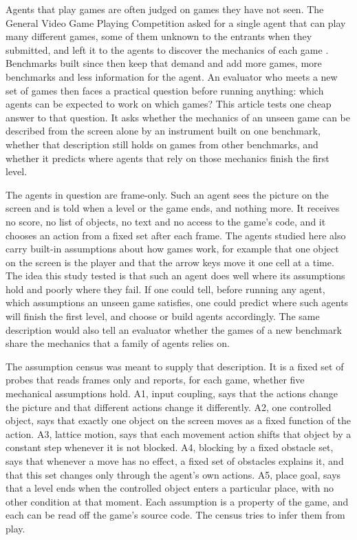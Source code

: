 \documentclass[twocolumn]{svjour3}
\begin{document}
Agents that play games are often judged on games they have not seen. The
General Video Game Playing Competition asked for a single agent that can
play many different games, some of them unknown to the entrants when
they submitted, and left it to the agents to discover the mechanics of
each game \citep{perezliebana2016gvgp}. Benchmarks built since then keep
that demand and add more games, more benchmarks and less information for
the agent. An evaluator who meets a new set of games then faces a
practical question before running anything: which agents can be expected
to work on which games? This article tests one cheap answer to that
question. It asks whether the mechanics of an unseen game can be
described from the screen alone by an instrument built on one benchmark,
whether that description still holds on games from other benchmarks, and
whether it predicts where agents that rely on those mechanics finish the
first level.

The agents in question are frame-only. Such an agent sees the picture on
the screen and is told when a level or the game ends, and nothing more.
It receives no score, no list of objects, no text and no access to the
game's code, and it chooses an action from a fixed set after each frame.
The agents studied here also carry built-in assumptions about how games
work, for example that one object on the screen is the player and that
the arrow keys move it one cell at a time. The idea this study tested is
that such an agent does well where its assumptions hold and poorly where
they fail. If one could tell, before running any agent, which
assumptions an unseen game satisfies, one could predict where such
agents will finish the first level, and choose or build agents
accordingly. The same description would also tell an evaluator whether
the games of a new benchmark share the mechanics that a family of agents
relies on.

The assumption census was meant to supply that description. It is a
fixed set of probes that reads frames only and reports, for each game,
whether five mechanical assumptions hold. A1, input coupling, says that
the actions change the picture and that different actions change it
differently. A2, one controlled object, says that exactly one object on
the screen moves as a fixed function of the action. A3, lattice motion,
says that each movement action shifts that object by a constant step
whenever it is not blocked. A4, blocking by a fixed obstacle set, says
that whenever a move has no effect, a fixed set of obstacles explains
it, and that this set changes only through the agent's own actions. A5,
place goal, says that a level ends when the controlled object enters a
particular place, with no other condition at that moment. Each
assumption is a property of the game, and each can be read off the
game's source code. The census tries to infer them from play.
\end{document}
